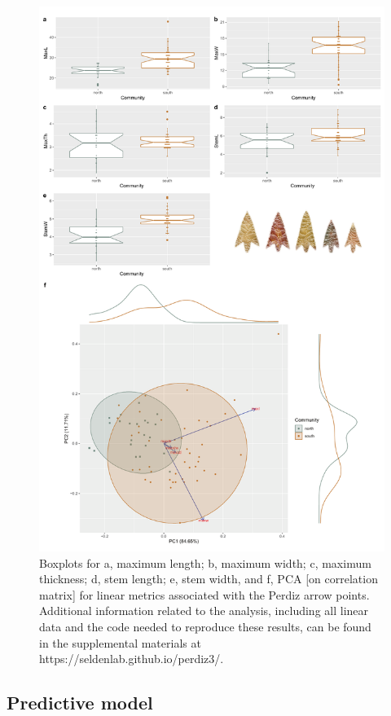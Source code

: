 \documentclass[smallextended]{svjour3}       %
\begin{document}
\begin{figure}
\includegraphics[width=0.95\linewidth]{ms-figs/figure2} \caption{Boxplots for a, maximum length; b, maximum width; c, maximum thickness; d, stem length; e, stem width, and f, PCA [on correlation matrix] for linear metrics associated with the Perdiz arrow points. Additional information related to the analysis, including all linear data and the code needed to reproduce these results, can be found in the supplemental materials at https://seldenlab.github.io/perdiz3/.}\label{fig:fig2}
\end{figure}

\hypertarget{predictive-model}{%
\subsection{Predictive model}\label{predictive-model}}
\end{document}

